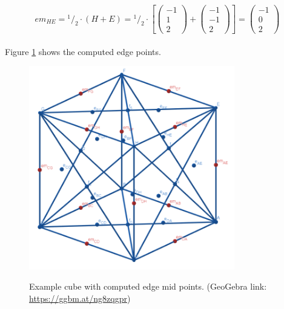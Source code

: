 \documentclass{article}
\newcommand*\rfrac[2]{{}^{#1}\!/_{#2}}%
\begin{document}
\[em_{HE}=\rfrac{1}{2}\cdot(H+E)=\rfrac{1}{2}\cdot\left[
\left({\begin{array}{c} -1 \\  1 \\ 2 \end{array}}\right)+
\left({\begin{array}{c} -1 \\  -1 \\ 2 \end{array}}\right)\right]=
\left({\begin{array}{c} -1 \\ 0 \\ 2 \end{array}}\right)
\]
\\
Figure \ref{fig:cube5} shows the computed edge points.
\begin{figure}[H]
\caption{Example cube with computed edge mid points. (GeoGebra link: \href{https://ggbm.at/ng8zqgpr}{https://ggbm.at/ng8zqgpr})}
\centering
\includegraphics[width=0.8\textwidth]{images/cl-05.png}
\label{fig:cube5}
\end{figure}
\end{document}
